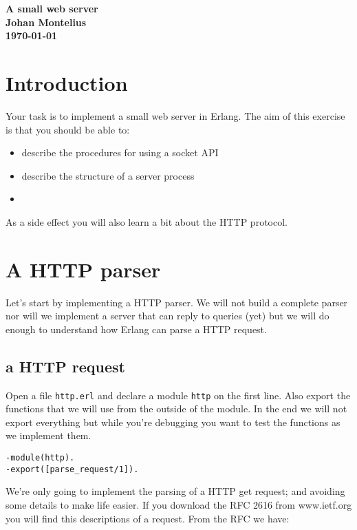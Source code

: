 \documentclass[a4paper,11pt]{article}
\newcommand{\nnsection}[1]{
\section*{#1}
\addcontentsline{toc}{section}{#1}
}
\begin{document}
\begin{center}
\vspace{20pt}
\textbf{\large A small web server}\\
\vspace{10pt}
\textbf{Johan Montelius}\\ 
\vspace{10pt}
\textbf{\today}
\end{center}

\nnsection{Introduction}

Your task is to implement a small web server in Erlang. The aim of
this exercise is that you should be able to:

\begin{itemize}
\item describe the procedures for using a socket API
\item describe the structure of a server process
\item 
\end{itemize}

As a side effect you will also learn a bit about the HTTP protocol.

\section{A HTTP parser}

Let's start by implementing a HTTP parser. We will not build a
complete parser nor will we implement a server that can reply to 
queries (yet) but we will do enough to understand how Erlang can 
parse a HTTP request.

\subsection{a HTTP request}

Open a file {\tt http.erl} and declare a module {\tt http} on the
first line. Also export the functions that we will use from the
outside of the module. In the end we will not export everything but
while you're debugging you want to test the functions as we implement them.


\begin{verbatim}
-module(http).
-export([parse_request/1]).
\end{verbatim}

We're only going to implement the parsing of a HTTP get request; and
avoiding some details to make life easier. If you download the RFC 2616 from
www.ietf.org you will find this descriptions of a request. From the RFC we have:
\end{document}
